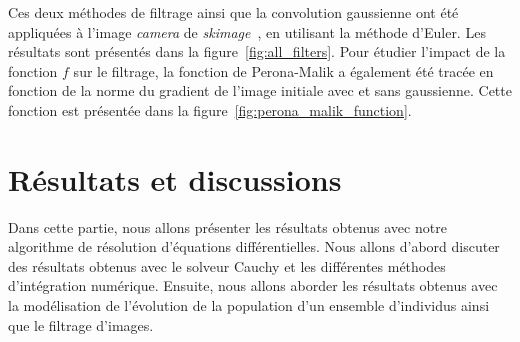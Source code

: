 \documentclass{article}
\begin{document}
Ces deux méthodes de filtrage ainsi que la convolution gaussienne ont été appliquées à l'image \textit{camera} de \textit{skimage}~\cite{scikit-image-camera}, en utilisant la méthode d'Euler. Les résultats sont présentés dans la figure~\ref{fig:all_filters}.
Pour étudier l'impact de la fonction \( f \) sur le filtrage, la fonction de Perona-Malik a également été tracée en fonction de la norme du gradient de l'image initiale avec et sans gaussienne. Cette fonction est présentée dans la figure~\ref{fig:perona_malik_function}.

\section{Résultats et discussions}
Dans cette partie, nous allons présenter les résultats obtenus avec notre algorithme de résolution d'équations différentielles. Nous allons d'abord discuter des résultats obtenus avec le solveur Cauchy et les différentes méthodes d'intégration numérique. Ensuite, nous allons aborder les résultats obtenus avec la modélisation de l'évolution de la population d'un ensemble d'individus ainsi que le filtrage d'images.
\end{document}
